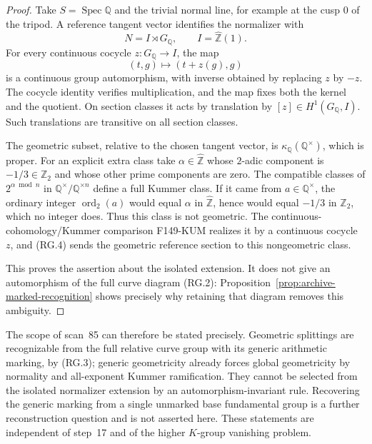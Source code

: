 \documentclass[11pt,a4paper]{article}
\theoremstyle{definition}
\begin{document}
\begin{proof}
Take $S=\operatorname{Spec}\mathbb Q$ and the trivial normal line,
for example at the cusp $0$ of the tripod. A reference tangent
vector identifies the normalizer with
\[
 N=I\rtimes G_{\mathbb Q},\qquad I=\widehat{\mathbb Z}(1).
\]
For every continuous cocycle $z:G_{\mathbb Q}\to I$, the map
\[
 (t,g)\longmapsto(t+z(g),g)                                 \tag{RG.4}
\]
is a continuous group automorphism, with inverse obtained by
replacing $z$ by $-z$. The cocycle identity verifies multiplication,
and the map fixes both the kernel and the quotient. On section
classes it acts by translation by $[z]\in H^1(G_{\mathbb Q},I)$.
Such translations are transitive on all section classes.

The geometric subset, relative to the chosen tangent vector, is
$\kappa_{\mathbb Q}(\mathbb Q^\times)$, which is proper.
For an explicit extra class take
$\alpha\in\widehat{\mathbb Z}$ whose $2$-adic component is
$-1/3\in\mathbb Z_2$ and whose other prime components are zero.
The compatible classes of $2^{\alpha\bmod n}$ in
$\mathbb Q^\times/\mathbb Q^{\times n}$ define a full Kummer class.
If it came from $a\in\mathbb Q^\times$, the ordinary integer
$\operatorname{ord}_2(a)$ would equal $\alpha$ in
$\widehat{\mathbb Z}$, hence would equal $-1/3$ in $\mathbb Z_2$,
which no integer does. Thus this class is not geometric.
The continuous-cohomology/Kummer comparison F149-KUM realizes it
by a continuous cocycle $z$, and (RG.4) sends the geometric
reference section to this nongeometric class.

This proves the assertion about the isolated extension. It does
not give an automorphism of the full curve diagram (RG.2):
Proposition~\ref{prop:archive-marked-recognition} shows precisely
why retaining that diagram removes this ambiguity.
\end{proof}

The scope of scan~85 can therefore be stated precisely. Geometric
splittings are recognizable from the full relative curve group
with its generic arithmetic marking, by (RG.3); generic geometricity
already forces global geometricity by normality and all-exponent
Kummer ramification. They cannot be selected from the isolated
normalizer extension by an automorphism-invariant rule. Recovering
the generic marking from a single unmarked base fundamental group
is a further reconstruction question and is not asserted here.
These statements are independent of step~17 and of the higher
$K$-group vanishing problem.
\end{document}
